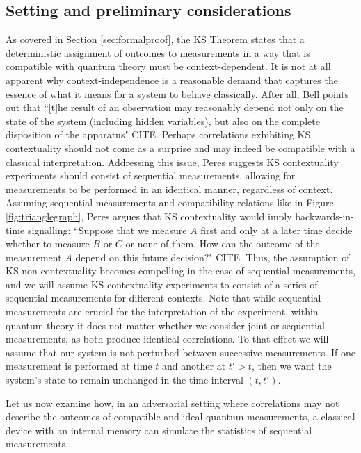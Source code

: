 \subsection{Setting and preliminary considerations}
As covered in Section \ref{sec:formalproof}, the KS Theorem states that a deterministic assignment of outcomes to measurements in a way that is compatible with quantum theory must be context-dependent. It is not at all apparent why context-independence is a reasonable demand that captures the essence of what it means for a system to behave classically. After all, Bell points out that ``[t]he result of an observation may reasonably depend not only
on the state of the system (including hidden variables), but also on the complete disposition of the apparatus" CITE. Perhaps correlations exhibiting KS contextuality should not come as a surprise and may indeed be compatible with a classical interpretation. Addressing this issue, Peres suggests KS contextuality experiments should consist of sequential measurements, allowing for measurements to be performed in an identical manner, regardless of context. Assuming sequential measurements and compatibility relations like in Figure \ref{fig:trianglegraph}, Peres argues that KS contextuality would imply backwards-in-time signalling: ``Suppose that we measure $A$ first and only at a later time decide whether to measure $B$ or $C$ or none of them. How can the outcome of the measurement $A$ depend on this future decision?" CITE. Thus, the assumption of KS non-contextuality becomes compelling in the case of sequential measurements, and we will assume KS contextuality experiments to consist of a series of sequential measurements for different contexts. Note that while sequential measurements are crucial for the interpretation of the experiment, within quantum theory it does not matter whether we consider joint or sequential measurements, as both produce identical correlations. To that effect we will assume that our system is not perturbed between successive measurements. If one measurement is performed at time $t$ and another at $t' > t$, then we want the system's state to remain unchanged in the time interval $(t, t')$.

Let us now examine how, in an adversarial setting where correlations may not describe the outcomes of compatible and ideal quantum measurements, a classical device with an internal memory can simulate the statistics of sequential measurements.

